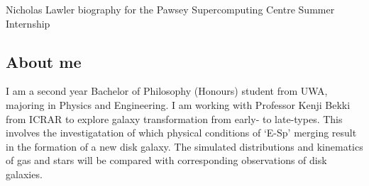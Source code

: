 Nicholas Lawler biography for the Pawsey Supercomputing Centre Summer Internship
\subsection{About me}
I am a second year Bachelor of Philosophy (Honours) student from UWA, majoring in Physics and Engineering. I am working with Professor Kenji Bekki from ICRAR to explore galaxy transformation from early- to late-types. This involves the investigatation of which physical conditions of `E-Sp’ merging result in the formation of a new disk galaxy. The simulated distributions and kinematics of gas and stars will be compared with corresponding observations of disk galaxies.

